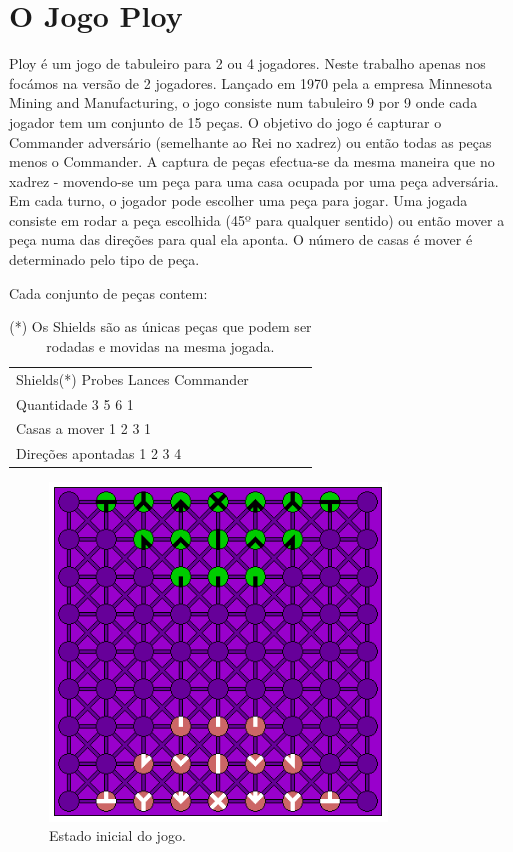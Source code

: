 \documentclass[a4paper]{article}
\begin{document}
\section{O Jogo Ploy}
Ploy é um jogo de tabuleiro para 2 ou 4 jogadores. Neste trabalho apenas nos focámos na versão de 2 jogadores.
Lançado em 1970 pela a empresa Minnesota Mining and Manufacturing, o jogo consiste num tabuleiro 9 por 9 onde cada jogador tem um conjunto de 15 peças.
O objetivo do jogo é capturar o Commander adversário (semelhante ao Rei no xadrez) ou então todas as peças menos o Commander. A captura de peças efectua-se da mesma maneira que no xadrez - movendo-se um peça para uma casa ocupada por uma peça adversária. Em cada turno, o jogador pode escolher uma peça para jogar. Uma jogada consiste em rodar a peça escolhida (45º para qualquer sentido) ou então mover a peça numa das direções para qual ela aponta. O número de casas é mover é determinado pelo tipo de peça.

Cada conjunto de peças contem:
\begin{table}[]
\centering
\label{Conjunto de peças de cada jogador.}
\begin{tabular}{lllll}
                   Shields(*) Probes  Lances  Commander \\
Quantidade         3          5       6       1         \\
Casas a mover      1          2       3       1         \\
Direções apontadas 1          2       3       4         \\
\end{tabular}
\caption{(*) Os Shields são as únicas peças que podem ser rodadas e movidas na mesma jogada.}
\end{table}

\begin{figure}[h]
\caption{Estado inicial do jogo.}
\centering
\includegraphics[width=0.8\textwidth]{ploy.gif}
\end{figure}
\end{document}
